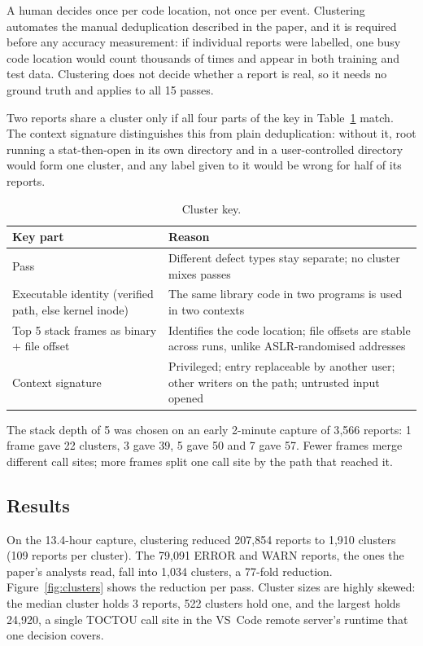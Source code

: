 \documentclass[11pt,a4paper]{article}
\begin{document}
A human decides once per code location, not once per event. Clustering automates the manual
deduplication described in the paper, and it is required before any accuracy measurement: if
individual reports were labelled, one busy code location would count thousands of times and appear
in both training and test data. Clustering does not decide whether a report is real, so it needs no
ground truth and applies to all 15 passes.

Two reports share a cluster only if all four parts of the key in Table~\ref{tab:key} match. The
context signature distinguishes this from plain deduplication: without it, root running a
stat-then-open in its own directory and in a user-controlled directory would form one cluster, and
any label given to it would be wrong for half of its reports.

\begin{table}[H]
\centering\small
\caption{Cluster key.}
\label{tab:key}
\begin{tabularx}{\linewidth}{@{}l X@{}}
\toprule
Key part & Reason \\
\midrule
Pass & Different defect types stay separate; no cluster mixes passes \\
Executable identity (verified path, else kernel inode) & The same library code in two programs is used in two contexts \\
Top 5 stack frames as binary + file offset & Identifies the code location; file offsets are stable across runs, unlike ASLR-randomised addresses \\
Context signature & Privileged; entry replaceable by another user; other writers on the path; untrusted input opened \\
\bottomrule
\end{tabularx}
\end{table}

The stack depth of 5 was chosen on an early 2-minute capture of 3{,}566 reports: 1 frame gave 22
clusters, 3 gave 39, 5 gave 50 and 7 gave 57. Fewer frames merge different call sites; more frames
split one call site by the path that reached it.

\subsection{Results}

On the 13.4-hour capture, clustering reduced 207{,}854 reports to 1{,}910 clusters (109 reports per
cluster). The 79{,}091 ERROR and WARN reports, the ones the paper's analysts read, fall into 1{,}034
clusters, a 77-fold reduction. Figure~\ref{fig:clusters} shows the reduction per pass. Cluster sizes
are highly skewed: the median cluster holds 3 reports, 522 clusters hold one, and the largest holds
24{,}920, a single TOCTOU call site in the VS~Code remote server's runtime that one decision covers.
\end{document}
